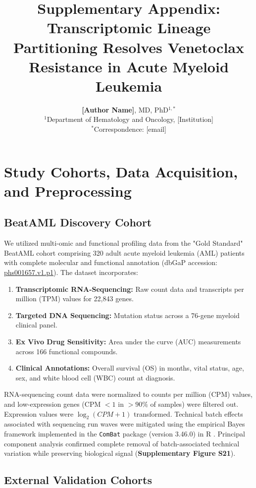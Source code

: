 \documentclass[11pt,a4paper]{article}
\title{\Large\textbf{Supplementary Appendix: Transcriptomic Lineage Partitioning Resolves Venetoclax Resistance in Acute Myeloid Leukemia}}
\author{
\textbf{[Author Name]}, MD, PhD$^{1,*}$ \\[0.3cm]
\small $^1$Department of Hematology and Oncology, [Institution] \\[0.2cm]
\small $^*$Correspondence: [email]
}
\date{}
\begin{document}
\maketitle

\tableofcontents
\newpage

\section{Study Cohorts, Data Acquisition, and Preprocessing}

\subsection{BeatAML Discovery Cohort}
We utilized multi-omic and functional profiling data from the "Gold Standard" BeatAML cohort comprising 320 adult acute myeloid leukemia (AML) patients with complete molecular and functional annotation (dbGaP accession: \href{https://www.ncbi.nlm.nih.gov/projects/gap/cgi-bin/study.cgi?study_id=phs001657.v1.p1}{phs001657.v1.p1}). The dataset incorporates:
\begin{enumerate}
    \item \textbf{Transcriptomic RNA-Sequencing:} Raw count data and transcripts per million (TPM) values for 22,843 genes.
    \item \textbf{Targeted DNA Sequencing:} Mutation status across a 76-gene myeloid clinical panel.
    \item \textbf{Ex Vivo Drug Sensitivity:} Area under the curve (AUC) measurements across 166 functional compounds.
    \item \textbf{Clinical Annotations:} Overall survival (OS) in months, vital status, age, sex, and white blood cell (WBC) count at diagnosis.
\end{enumerate}
RNA-sequencing count data were normalized to counts per million (CPM) values, and low-expression genes (CPM $< 1$ in $> 90\%$ of samples) were filtered out. Expression values were $\log_2(CPM + 1)$ transformed. Technical batch effects associated with sequencing run waves were mitigated using the empirical Bayes framework implemented in the \texttt{ComBat} package (version 3.46.0) in R \cite{johnson2007combat}. Principal component analysis confirmed complete removal of batch-associated technical variation while preserving biological signal (\textbf{Supplementary Figure S21}).

\subsection{External Validation Cohorts}
\end{document}
